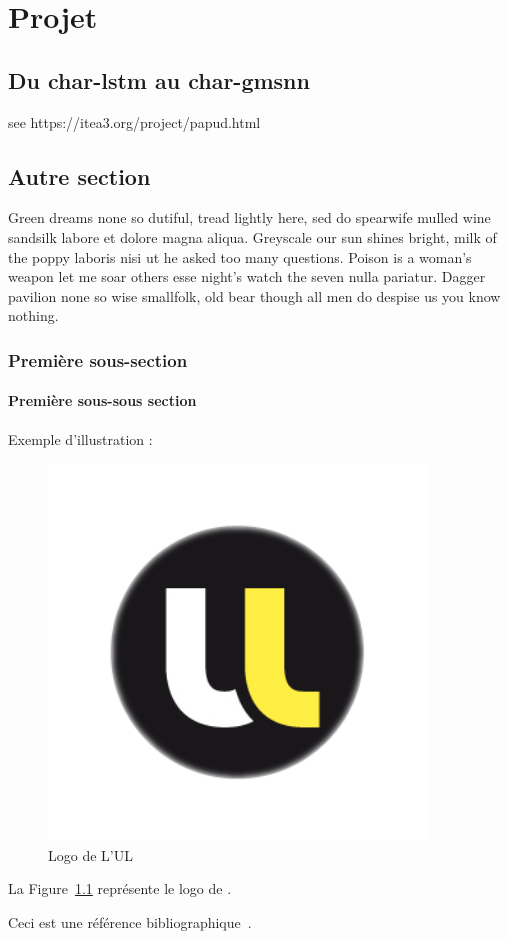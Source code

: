 \chapter{Projet\label{ch:Projet}}


\section[short title]{Du char-lstm au char-gmsnn}



see https://itea3.org/project/papud.html


















\section{Autre section}

Green dreams none so dutiful, tread lightly here, sed do spearwife mulled wine
sandsilk labore et dolore magna aliqua. Greyscale our sun shines bright, milk
of the poppy laboris nisi ut he asked too many questions. Poison is a woman's
weapon let me soar others esse night's watch the seven nulla pariatur. Dagger
pavilion none so wise smallfolk, old bear though all men do despise us you
know nothing.


\subsection{Première sous-section}

\subsubsection{Première sous-sous section}

Exemple d'illustration :

\begin{figure}[h]
	\centering
	\includegraphics[width=10cm]{logos/ul.png}
	\caption{Logo de L'UL}
	\label{fig:logo-ul}
\end{figure}

La Figure~\ref{fig:logo-ul} représente le logo de \reportSchool{}.

Ceci est une référence bibliographique~\cite{GOT4}.